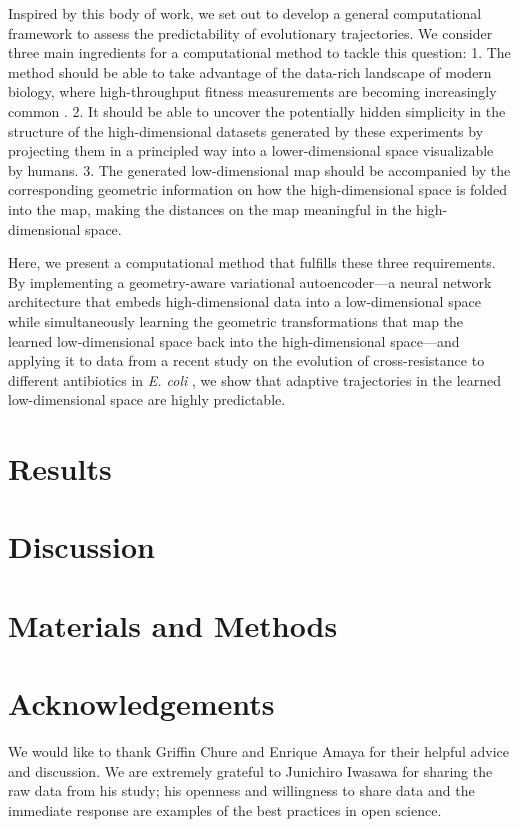 \documentclass[
]{scrartcl}
\begin{document}
\begin{refsegment}
Inspired by this body of work, we set out to develop a general
computational framework to assess the predictability of evolutionary
trajectories. We consider three main ingredients for a computational
method to tackle this question: 1. The method should be able to take
advantage of the data-rich landscape of modern biology, where
high-throughput fitness measurements are becoming increasingly common
\autocite{kinsler2020,maeda2020,iwasawa2022}. 2. It should be able to
uncover the potentially hidden simplicity in the structure of the
high-dimensional datasets generated by these experiments by projecting
them in a principled way into a lower-dimensional space visualizable by
humans. 3. The generated low-dimensional map should be accompanied by
the corresponding geometric information on how the high-dimensional
space is folded into the map, making the distances on the map meaningful
in the high-dimensional space.

Here, we present a computational method that fulfills these three
requirements. By implementing a geometry-aware variational
autoencoder---a neural network architecture that embeds high-dimensional
data into a low-dimensional space while simultaneously learning the
geometric transformations that map the learned low-dimensional space
back into the high-dimensional space---and applying it to data from a
recent study on the evolution of cross-resistance to different
antibiotics in \emph{E. coli} \autocite{iwasawa2022}, we show that
adaptive trajectories in the learned low-dimensional space are highly
predictable.

\section{Results}\label{results}

\section{Discussion}\label{discussion}

\section*{Materials and Methods}\label{materials-and-methods}

\section*{Acknowledgements}\label{acknowledgements}

We would like to thank Griffin Chure and Enrique Amaya for their helpful
advice and discussion. We are extremely grateful to Junichiro Iwasawa
for sharing the raw data from his study; his openness and willingness to
share data and the immediate response are examples of the best practices
in open science.

\printbibliography[segment=\therefsegment]
\end{refsegment}

\clearpage
\end{document}
